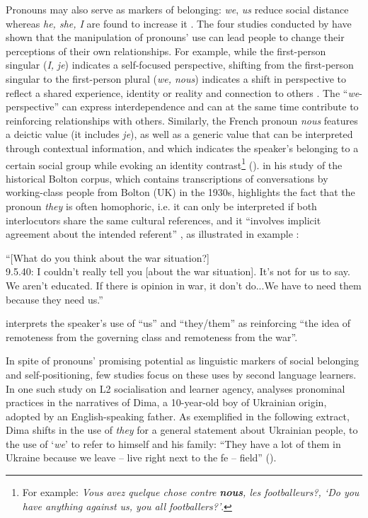 \documentclass[output=paper]{langscibook}
\begin{document}
Pronouns may also serve as markers of belonging: \textit{we}, \textit{us} reduce social distance whereas \textit{he, she, I} are found to increase it \citep{Semin2007}. The four studies conducted by \citet{FitzsimonsKay2004} have shown that the manipulation of pronouns’ use can lead people to change their perceptions of their own relationships. For example, while the first-person singular (\textit{I,} \textit{je}) indicates a self-focused perspective, shifting from the first-person singular to the first-person plural (\textit{we, nous}) indicates a shift in perspective to reflect a shared experience, identity or reality and connection to others \citep{OrvelEtAl2022}. The “\textit{we}{}-perspective” can express interdependence \citep{AgnewEtAl1998} and can at the same time contribute to reinforcing relationships with others. Similarly, the French pronoun \textit{nous} features a deictic value (it includes \textit{je}), as well as a generic value that can be interpreted through contextual information, and which indicates the speaker’s belonging to a certain social group while evoking an identity contrast\footnote{For example: \textit{Vous avez quelque chose contre} \textbf{\textit{nous}}\textit{, les footballeurs?, ‘Do you have anything against us, you all footballers?’}.} (\citealt[5]{HilgertPalma2014}). \citet{Timmis2015} in his study of the historical Bolton corpus, which contains transcriptions of conversations by working-class people from Bolton (UK) in the 1930s, highlights the fact that the pronoun \textit{they} is often homophoric, i.e. it can only be interpreted if both interlocutors share the same cultural references, and it “involves implicit agreement about the intended referent” \citep[131]{Timmis2015}, as illustrated in example :

\ea%
    \label{ex:1}
    “[What do you think about the war situation?]\\
    9.5.40: I couldn’t really tell you [about the war situation]. It’s not for us to say. We aren’t educated. If there is opinion in war, it don’t do...We have to need them because they need us.” \citep[126]{Timmis2015}
\z

\citet[126]{Timmis2015} interprets the speaker’s use of “us” and “they/them” as reinforcing “the idea of remoteness from the governing class and remoteness from the war”.

In spite of pronouns’ promising potential as linguistic markers of social belonging and self-positioning, few studies focus on these uses by second language learners. In one such study on L2 socialisation and learner agency, \citet{WrightFogle2012} analyses pronominal practices in the narratives of Dima, a 10-year-old boy of Ukrainian origin, adopted by an English-speaking father. As exemplified in the following extract, Dima shifts in the use of \textit{they} for a general statement about Ukrainian people, to the use of ‘\textit{we}’ to refer to himself and his family: “They have a lot of them in Ukraine because we leave – live right next to the fe – field” (\citealt[93]{WrightFogle2012}).
\end{document}

